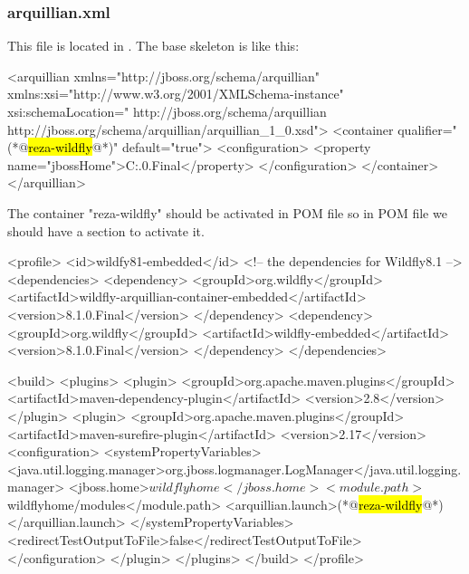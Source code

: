 \subsubsection{arquillian.xml}
This file is located in . The base skeleton is like this:

\begin{xmlcode}
<arquillian xmlns="http://jboss.org/schema/arquillian"
            xmlns:xsi="http://www.w3.org/2001/XMLSchema-instance"
            xsi:schemaLocation="
        http://jboss.org/schema/arquillian
        http://jboss.org/schema/arquillian/arquillian_1_0.xsd">
    <container qualifier="(*@\hl{reza-wildfly}@*)" default="true">
        <configuration>
            <property name="jbossHome">C:\unix{}.0.Final</property>
        </configuration>
    </container>
</arquillian>
\end{xmlcode}

The container "reza-wildfly" should be activated in POM file so in POM file we should have a section to activate it.

\begin{xmlcode}
<profile>
    <id>wildfy81-embedded</id>
    <!-- the dependencies for Wildfly8.1  -->
    <dependencies>
        <dependency>
            <groupId>org.wildfly</groupId>
            <artifactId>wildfly-arquillian-container-embedded</artifactId>
            <version>8.1.0.Final</version>
        </dependency>
        <dependency>
            <groupId>org.wildfly</groupId>
            <artifactId>wildfly-embedded</artifactId>
            <version>8.1.0.Final</version>
        </dependency>
    </dependencies>

    <build>
        <plugins>
            <plugin>
                <groupId>org.apache.maven.plugins</groupId>
                <artifactId>maven-dependency-plugin</artifactId>
                <version>2.8</version>
            </plugin>
            <plugin>
                <groupId>org.apache.maven.plugins</groupId>
                <artifactId>maven-surefire-plugin</artifactId>
                <version>2.17</version>
                <configuration>
                    <systemPropertyVariables>
                        <java.util.logging.manager>org.jboss.logmanager.LogManager</java.util.logging.manager>
                        <jboss.home>${wildflyhome}</jboss.home>
                        <module.path>${wildflyhome}/modules</module.path>
                        <arquillian.launch>(*@\hl{reza-wildfly}@*)</arquillian.launch>
                    </systemPropertyVariables>
                    <redirectTestOutputToFile>false</redirectTestOutputToFile>
                </configuration>
            </plugin>
        </plugins>
    </build>
</profile>
\end{xmlcode}
